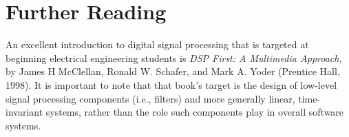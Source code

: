 \section*{Further Reading}

An excellent introduction to digital signal processing that is
targeted at beginning electrical engineering students is \textit{DSP
  First: A Multimedia Approach}, by James H McClellan, Ronald
W. Schafer, and Mark A. Yoder (Prentice Hall, 1998).  It is important
to note that that book's target is the design of low-level signal
processing components (i.e., filters) and more generally linear,
time-invariant systems, rather than the role such components play in
overall software systems.
